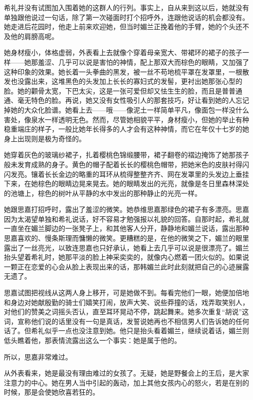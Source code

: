 \par 希礼并没有试图加入围着她的这群人的行列。事实上，自从来到这以后，她就没有单独跟他说过一句话，除了第一次碰面时打个招呼外，连跟他说话的机会都没有。她走进后花园时，他走上前来欢迎她，但当时媚兰正挽着他的手臂，她的个头还不及他的肩膀高呢。
\par 她身材瘦小，体格虚弱，外表看上去就像个穿着母亲宽大、带裙环的裙子的孩子一样——她那羞涩、几乎可以说是害怕的神情，配上那双大而棕色的眼睛，又加强了这种印象的效果。她长着一头拳曲的黑发，被一丝不苟地梳平罩在发罩里，一根散发也没露出来，这堆黑色的头发加上长长的寡妇式的发髻，更衬出她那张心型的脸。她的颧骨太宽，下巴太尖，这是一张可爱但却又怯生生的脸，而且是普普通通、毫无特色的脸。再说，她又没有女性吸引人的那套技巧，好让看到她的人忘记掉她的大众化脸谱。她看上去——哦——像泥土一样简单平凡，像面包一样没什么害处，像泉水一样透明无色。然而，尽管她相貌平平，身材瘦小，但她的举止有种稳重端庄的样子，一般比她年长得多的人才会有这种神情，而它在年仅十七岁的她身上出现则是极为奇怪的。
\par 她穿着灰色的玻璃纱裙子，扎着樱桃色锦缎腰带，裙子翻卷的褶边掩饰了她那孩子般未发育成熟的身子。黄色的帽子配着长长的樱桃色帽带，把她米色的皮肤衬得闪闪发亮。镶着长长金边的略重的耳环从梳得整整齐齐、网在发罩里的头发边上垂挂下来，在她棕色的眼睛边晃来晃去。她的眼睛发出的光亮，就像是冬日里森林深处的池塘上，棕色的树叶从平静的水中发出的那种静止的光亮一样。
\par 她跟思嘉打招呼时，露出了羞涩的微笑。她恭维思嘉那绿色的裙子有多漂亮。思嘉因为太渴望单独和希礼说话，好不容易才勉强报以礼貌的回答。自那时起，希礼就一直坐在媚兰脚边的一张凳子上，和其他客人分开，静静地和媚兰说话，露出那种思嘉喜欢的、慢条斯理而慵懒的微笑。更糟糕的是，在他的微笑之下，媚兰的眼里露出了一丝亮光，以致连思嘉也只好承认，她看上去几乎可以说是很漂亮了。媚兰抬头望着希礼时，她那平淡的脸上神采奕奕的，就像内心燃着一团火似的。如果说一颗正在恋爱的心会从脸上表现出来的话，那韩媚兰此时此刻就把自己的心迹展露无遗了。
\par 思嘉试图把视线从这两人身上移开，可是她做不到。每看完他们一眼，她便加倍地和身边对她献殷勤的骑士们嬉笑打闹，放声大笑、说些莽撞的话，戏弄取笑别人，对他们的赞美之词摇头否认，直至耳环晃动不停，跳起舞来。她多次重复“胡说”这词，宣称他们说的话里没有一句是真话，发誓说她再也不相信男人们告诉她的任何话了。但希礼似乎一点也没注意到她。他只是抬头看着媚兰，继续说着话，媚兰则低头瞧着他，那表情流露出这么一个事实：她是属于他的。
\par 所以，思嘉非常难过。
\par 从外表看来，她是最没有理由难过的女孩了。无疑，她是野餐会上的王后，是大家注意力的中心。她在男人当中引起的轰动，加上其他女孩内心的怒火，若是在别的时候，那是会使她欣喜若狂的。
